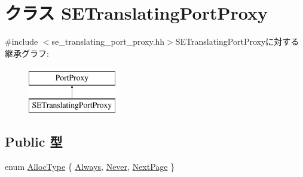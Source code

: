 \hypertarget{classSETranslatingPortProxy}{
\section{クラス SETranslatingPortProxy}
\label{classSETranslatingPortProxy}
}


{\ttfamily \#include $<$se\_\-translating\_\-port\_\-proxy.hh$>$}SETranslatingPortProxyに対する継承グラフ:\begin{figure}[H]
\begin{center}
\leavevmode
\includegraphics[height=2cm]{classSETranslatingPortProxy}
\end{center}
\end{figure}
\subsection*{Public 型}
\begin{DoxyCompactItemize}
\item 
enum \hyperlink{classSETranslatingPortProxy_ac60b92a362d833ef83dd912047a36afe}{AllocType} \{ \hyperlink{classSETranslatingPortProxy_ac60b92a362d833ef83dd912047a36afeae1a8e8cd4807ad56b76df10995885c33}{Always}, 
\hyperlink{classSETranslatingPortProxy_ac60b92a362d833ef83dd912047a36afea7e83d9961aaf0904a80ba6bbfd6c4bcc}{Never}, 
\hyperlink{classSETranslatingPortProxy_ac60b92a362d833ef83dd912047a36afea5567507a742ffde8d91a85cccb511d16}{NextPage}
 \}
\end{DoxyCompactItemize}
